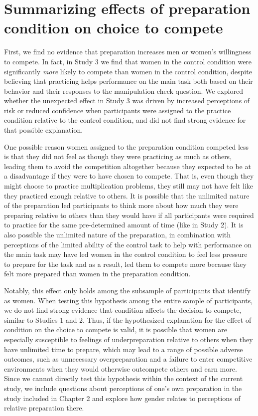 \documentclass[a4paper, nobind]{templates/ociamthesis}
\begin{document}
\hypertarget{summarizing-effects-of-preparation-condition-on-choice-to-compete}{%
\section{Summarizing effects of preparation condition on choice to compete}\label{summarizing-effects-of-preparation-condition-on-choice-to-compete}}

First, we find no evidence that preparation increases men or women's willingness to compete. In fact, in Study 3 we find that women in the control condition were significantly \emph{more} likely to compete than women in the control condition, despite believing that practicing helps performance on the main task both based on their behavior and their responses to the manipulation check question. We explored whether the unexpected effect in Study 3 was driven by increased perceptions of risk or reduced confidence when participants were assigned to the practice condition relative to the control condition, and did not find strong evidence for that possible explanation.

One possible reason women assigned to the preparation condition competed less is that they did not feel as though they were practicing as much as others, leading them to avoid the competition altogether because they expected to be at a disadvantage if they were to have chosen to compete. That is, even though they might choose to practice multiplication problems, they still may not have felt like they practiced enough relative to others. It is possible that the unlimited nature of the preparation led participants to think more about how much they were preparing relative to others than they would have if all participants were required to practice for the same pre-determined amount of time (like in Study 2). It is also possible the unlimited nature of the preparation, in combination with perceptions of the limited ability of the control task to help with performance on the main task may have led women in the control condition to feel less pressure to prepare for the task and as a result, led them to compete more because they felt more prepared than women in the preparation condition.

Notably, this effect only holds among the subsample of participants that identify as women. When testing this hypothesis among the entire sample of participants, we do not find strong evidence that condition affects the decision to compete, similar to Studies 1 and 2. Thus, if the hypothesized explanation for the effect of condition on the choice to compete is valid, it is possible that women are especially susceptible to feelings of underpreparation relative to others when they have unlimited time to prepare, which may lead to a range of possible adverse outcomes, such as unnecessary overpreparation and a failure to enter competitive environments when they would otherwise outcompete others and earn more. Since we cannot directly test this hypothesis within the context of the current study, we include questions about perceptions of one's own preparation in the study included in Chapter 2 and explore how gender relates to perceptions of relative preparation there.
\end{document}
